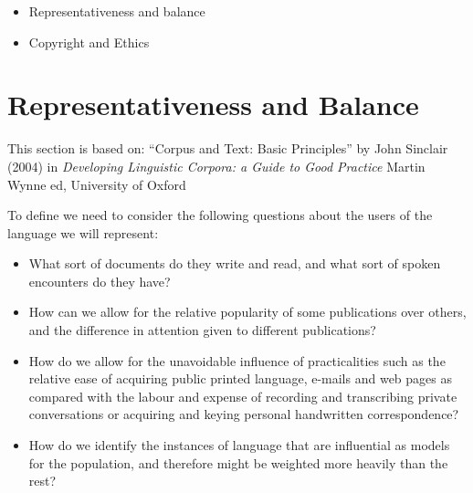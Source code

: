 \documentclass[a4paper,landscape,headrule,footrule,xetex]{foils}
\begin{document}

\maketitle



\begin{itemize} 
\item Representativeness and balance
\item Copyright and Ethics
\end{itemize}


\section{Representativeness and Balance}
\MyLogo{}
This section is based on: ``Corpus and Text: Basic Principles'' by
John Sinclair (2004) in \textit{Developing Linguistic Corpora: a Guide
  to Good Practice} Martin Wynne ed, University of Oxford


To define  we need to consider the following questions about the users of the language we will represent:

\begin{itemize}
\item  What sort of documents do they write and read, and what sort of spoken encounters do they have?
\item How can we allow for the relative popularity of some publications over others, and the difference in attention given to different publications?
\item How do we allow for the unavoidable influence of practicalities such as the relative ease of acquiring public printed language, e-mails and web pages as compared with the labour and expense of recording and transcribing private conversations or acquiring and keying personal handwritten correspondence?
\item How do we identify the instances of language that are influential as models for the population, and therefore might be weighted more heavily than the rest?
\end{itemize}
\end{document}
